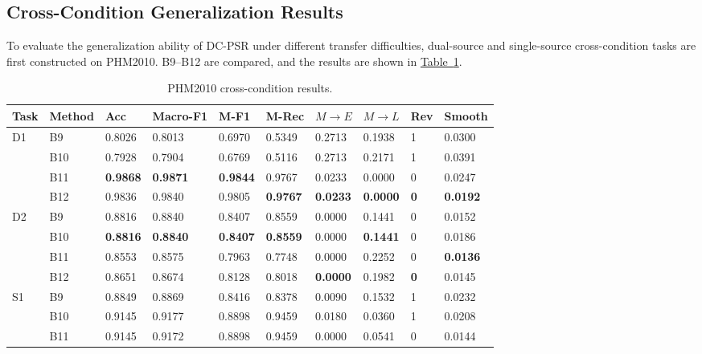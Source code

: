 \documentclass[a4paper,fleqn]{cas-sc}
\providecommand{\tabref}{}
\renewcommand{\tabref}[1]{\hyperref[#1]{Table~\ref*{#1}}}
\begin{document}
  \subsection{Cross-Condition Generalization Results}
\label{sec:cross_condition}
  To evaluate the generalization ability of DC-PSR under different transfer difficulties, dual-source and single-source cross-condition tasks are first constructed on PHM2010. B9--B12 are compared, and the results are shown in \tabref{tab:9}.

  \begin{table}[!htbp]
    \centering
    \scriptsize
  \caption{PHM2010 cross-condition results.}
    \label{tab:9}
    \begin{adjustbox}{max width=\textwidth}
      \begin{tabular}{llllllllll}
        \toprule
        \textbf{Task} & \textbf{Method} & \textbf{Acc} & \textbf{Macro-F1} & \textbf{M-F1} & \textbf{M-Rec} & \textbf{$M\rightarrow E$} & \textbf{$M\rightarrow L$} & \textbf{Rev} & \textbf{Smooth} \\
        \midrule
        D1 & B9 & 0.8026 & 0.8013 & 0.6970 & 0.5349 & 0.2713 & 0.1938 & 1 & 0.0300 \\
        & B10 & 0.7928 & 0.7904 & 0.6769 & 0.5116 & 0.2713 & 0.2171 & 1 & 0.0391 \\
        & B11 & \textbf{0.9868} & \textbf{0.9871} & \textbf{0.9844} & 0.9767 & 0.0233 & 0.0000 & 0 & 0.0247 \\
        & B12 & 0.9836 & 0.9840 & 0.9805 & \textbf{0.9767} & \textbf{0.0233} & \textbf{0.0000} & \textbf{0} & \textbf{0.0192} \\
        D2 & B9 & 0.8816 &0.8840 & 0.8407 & 0.8559 & 0.0000 & 0.1441 & 0 & 0.0152 \\
        & B10 & \textbf{0.8816} & \textbf{0.8840} & \textbf{0.8407} & \textbf{0.8559} & 0.0000 & \textbf{0.1441} & 0 & 0.0186 \\
        & B11 & 0.8553 & 0.8575 & 0.7963 & 0.7748 & 0.0000 & 0.2252 & 0 & \textbf{0.0136} \\
        & B12 & 0.8651 & 0.8674 & 0.8128 & 0.8018 & \textbf{0.0000} & 0.1982 & \textbf{0} & 0.0145 \\
        S1 & B9 & 0.8849 & 0.8869 & 0.8416 & 0.8378 & 0.0090 & 0.1532 & 1 & 0.0232 \\
        & B10 & 0.9145 & 0.9177 & 0.8898 & 0.9459 & 0.0180 & 0.0360 & 1 & 0.0208 \\
        & B11 & 0.9145 & 0.9172 & 0.8898 & 0.9459 & 0.0000 & 0.0541 & 0 & 0.0144 \\

\end{tabular}
\end{adjustbox}
\end{table}
\end{document}
